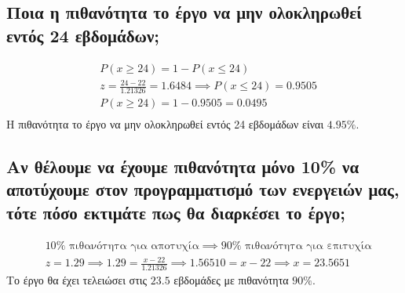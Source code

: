 \documentclass[12pt]{turabian-researchpaper}
\begin{document}
\subsection{Ποια η πιθανότητα το έργο να μην ολοκληρωθεί εντός 24 εβδομάδων;}
\begin{equation*}
    \begin{aligned}
         & P(x \geq 24) = 1 - P(x \leq 24)                                   \\
         & z = \frac{24-22}{1.21326} = 1.6484 \implies P(x \leq 24) = 0.9505 \\
         & P(x \geq 24) = 1 - 0.9505 = 0.0495                                \\
    \end{aligned}
\end{equation*}
Η πιθανότητα το έργο να μην ολοκληρωθεί εντός 24 εβδομάδων είναι $ 4.95 \% $.

\subsection{Αν θέλουμε να έχουμε πιθανότητα μόνο 10\% να αποτύχουμε στον προγραμματισμό των ενεργειών μας, τότε πόσο εκτιμάτε πως θα διαρκέσει το έργο;}
\begin{equation*}
    \begin{aligned}
         & 10\% \text{ πιθανότητα για αποτυχία} \implies 90\% \text{ πιθανότητα για επιτυχία}             \\
         & z = 1.29 \implies 1.29 = \frac{x - 22}{1.21326} \implies 1.56510 = x - 22 \implies x = 23.5651
    \end{aligned}
\end{equation*}
Το έργο θα έχει τελειώσει στις $ 23.5 $ εβδομάδες με πιθανότητα $ 90 \% $.
\end{document}
